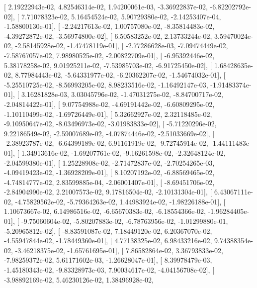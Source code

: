 \documentclass{article}
\begin{document}
       [  2.19222943e-02,   4.82546314e-02,   1.94200061e-03,
         -3.36922837e-02,  -6.82202792e-02],
       [  7.71078323e-02,   5.16454524e-02,   5.90729380e-02,
         -2.14253407e-04,  -1.58800130e-01],
       [ -2.24217613e-02,   1.00757080e-02,  -8.35814483e-02,
         -4.39272872e-02,  -3.56974800e-02],
       [  6.50583252e-02,   2.13733244e-02,   3.59470024e-02,
         -2.58145928e-02,  -1.47478119e-01],
       [ -2.77286628e-03,  -7.09474449e-02,  -7.58767057e-02,
          7.98980525e-02,  -2.00822709e-01],
       [ -6.95392446e-02,   5.38178258e-02,   9.01925211e-02,
         -7.53985703e-02,  -6.91725450e-02],
       [  1.68428635e-02,   8.77984443e-02,  -5.64331977e-02,
         -6.20362207e-02,  -1.54674032e-01],
       [ -5.25510725e-02,  -8.56993205e-02,   8.98233516e-02,
         -1.16492147e-03,  -1.91483374e-01],
       [  3.16281828e-03,   3.03045796e-02,  -1.47031275e-02,
         -8.84700717e-02,  -2.04814422e-01],
       [  9.07754988e-02,  -4.69191442e-02,  -6.60809295e-02,
         -1.10110499e-02,  -1.69726449e-01],
       [  5.32662927e-02,   2.32118485e-02,  -9.10950647e-02,
         -8.03496973e-02,  -3.01983833e-02],
       [ -5.71220296e-02,   9.22186549e-02,  -2.59007689e-02,
         -4.07874446e-02,  -2.51033669e-02],
       [ -2.38923787e-02,  -6.64399189e-02,   6.91161919e-02,
         -9.72745914e-02,  -1.44111483e-01],
       [  1.34913616e-02,  -1.69207761e-02,  -9.16261598e-02,
         -2.32648124e-02,  -2.04599380e-01],
       [  1.25228908e-02,  -2.71472837e-02,  -2.70254265e-03,
         -4.09419423e-02,  -1.36928209e-01],
       [  8.10207192e-02,  -6.88569465e-02,  -4.74814777e-02,
          2.83599885e-04,  -2.06001407e-01],
       [ -8.69451706e-02,  -2.84904990e-02,   2.21007573e-02,
          9.17816504e-02,  -2.10131304e-01],
       [  6.43067111e-02,  -4.75829562e-02,  -5.79364263e-02,
          1.44983924e-02,  -1.98226188e-01],
       [  1.10673667e-02,   6.14986516e-02,  -6.65670383e-02,
         -6.18554366e-02,  -1.96284405e-01],
       [ -9.75060604e-02,  -5.80207883e-02,  -6.78763956e-02,
         -1.01299880e-01,  -5.20965812e-02],
       [ -8.83591087e-02,   7.18449120e-02,   6.20367070e-02,
         -4.55947844e-02,  -1.78449360e-01],
       [  4.77138325e-02,   6.98433216e-02,   9.74388354e-02,
         -3.46218375e-02,  -1.65761695e-01],
       [  7.86582864e-02,   3.36793833e-02,  -7.98259372e-02,
          5.61171602e-03,  -1.26628047e-01],
       [  8.39978479e-03,  -1.45180343e-02,  -9.83328973e-03,
          7.90034617e-02,  -4.04156708e-02],
       [ -3.98892169e-02,   5.46230126e-02,   1.38496928e-02,
\end{document}
